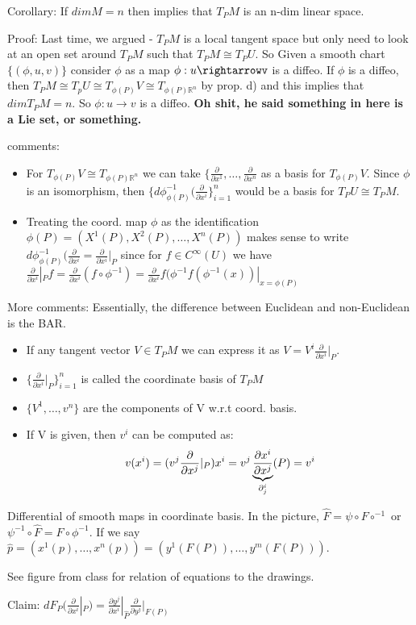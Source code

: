 \documentclass[12pt,letterpaper]{article}
\begin{document}
Corollary: If $dimM = n$ then implies that $T_PM$ is an n-dim linear space. 

Proof: Last time, we argued - $T_PM$ is a local tangent space but only need to look at an open set around $T_P M$ such that $T_P M \cong T_P U$. So Given a smooth chart $\{ (\phi, u, v)\}$ consider $\phi$ as a map $\phi: u \rightarrowv$ is a diffeo. If $\phi$ is a diffeo, then $T_PM \cong T_pU \cong T_{\phi(P)}V \cong T_{\phi(P) \mathbb{R}^n}$ by prop. d) and this implies that $dim T_PM = n$. So $\phi: u\rightarrow v$ is a diffeo. \textbf{Oh shit, he said something in here is a Lie set, or something.}

comments: 
\begin{itemize}
    \item For $T_{\phi(P)}V \cong T_{\phi(P) \mathbb{R}^n}$ we can take $\{ \frac{\partial}{\partial x^1} , \dots, \frac{\partial}{\partial x^n}$ as a basis for $T_{\phi(P)}V$. Since $\phi$ is an isomorphism, then $\{ d\phi^{-1}_{\phi(P)}(\frac{\partial}{\partial x^i}\}^n_{i=1}$ would be a basis for $T_P U \cong T_P M$.
    \item Treating the coord. map $\phi$ as the identification $\phi(P) = (X^1(P), X^2(P), \dots, X^n(P))$ makes sense to write $d\phi ^{-1}_{\phi (P)} (\frac{\partial}{\partial x^i} = \frac{\partial }{\partial x^i}|_P$ since for $f \in C^{\infty}(U)$ we have $\frac{\partial}{\partial x^i}|_P f = \frac{\partial}{\partial x^i}(f \circ \phi^{-1}) = \frac{\partial}{\partial x^i} f(\phi^{-1}f ( \phi^{-1}(x))|_{x=\phi(P)}$
\end{itemize}

More comments: Essentially, the difference between Euclidean and non-Euclidean is the BAR.
\begin{itemize}
    \item If any tangent vector $V \in T_P M$ we can express it as $V = V^i \frac{\partial}{\partial x^i}|_P$. 
    \item $\{\frac{\partial}{\partial x^i}|_P \}^n_{i=1}$ is called the coordinate basis of $T_PM$
    \item $\{ V^1, \dots , v^n\}$ are the components of V w.r.t coord. basis. 
    \item If V is given, then $v^i$ can be computed as:
    \begin{equation}
        v(x^i) = (v^j \frac{\partial}{\partial x^j}|_P ) x^i\\
        = v^j \underbrace{\frac{\partial x^i}{\partial x^j}}_{\partial^i_j}(P) = v^i
    \end{equation}
\end{itemize}

Differential of smooth maps in coordinate basis. In the picture, $\hat{F} = \psi \circ F \circ^{-1}$ or $\psi^{-1} \circ \hat{F} = F \circ \phi ^{-1}$. If we say $\hat{p} = (x^1(p), \dots , x^n(p)) =  (y^1(F(P)), \dots, y^m(F(P)))$. 

See figure from class for relation of equations to the drawings. 

Claim: $dF_P (\frac{\partial}{\partial x^i}|_P) = \frac{\partial y^j}{\partial x^i}|_{\hat{P}} \frac{\partial }{\partial y^j}|_{F(P)}$
 
\end{document}

